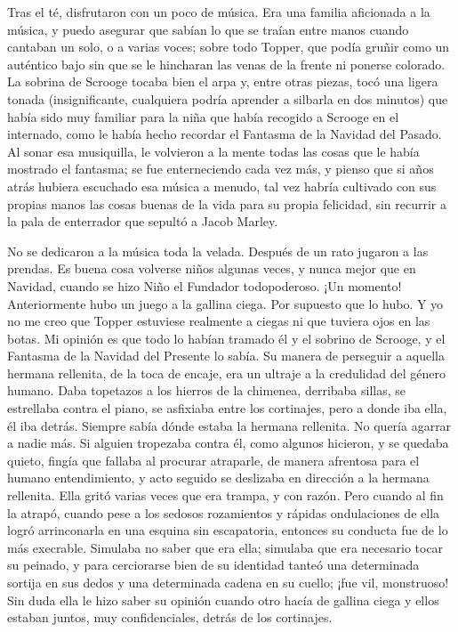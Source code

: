 \documentclass{novela}
\begin{document}
 Tras el té, disfrutaron con un poco de música. Era una familia aficionada a la música, y puedo asegurar que sabían lo que se traían entre manos cuando cantaban un solo, o a varias voces; sobre todo Topper, que podía gruñir como un auténtico bajo sin que se le hincharan las venas de la frente ni ponerse colorado. La sobrina de Scrooge tocaba bien el arpa y, entre otras piezas, tocó una ligera tonada (insignificante, cualquiera podría aprender a silbarla en dos minutos) que había sido muy familiar para la niña que había recogido a Scrooge en el internado, como le había hecho recordar el Fantasma de la Navidad del Pasado. Al sonar esa musiquilla, le volvieron a la mente todas las cosas que le había mostrado el fantasma; se fue enterneciendo cada vez más, y pienso que si años atrás hubiera escuchado esa música a menudo, tal vez habría cultivado con sus propias manos las cosas buenas de la vida para su propia felicidad, sin recurrir a la pala de enterrador que sepultó a Jacob Marley.

 No se dedicaron a la música toda la velada. Después de un rato jugaron a las prendas. Es buena cosa volverse niños algunas veces, y nunca mejor que en Navidad, cuando se hizo Niño el Fundador todopoderoso. ¡Un momento! Anteriormente hubo un juego a la gallina ciega. Por supuesto que lo hubo. Y yo no me creo que Topper estuviese realmente a ciegas ni que tuviera ojos en las botas. Mi opinión es que todo lo habían tramado él y el sobrino de Scrooge, y el Fantasma de la Navidad del Presente lo sabía. Su manera de perseguir a aquella hermana rellenita, de la toca de encaje, era un ultraje a la credulidad del género humano. Daba topetazos a los hierros de la chimenea, derribaba sillas, se estrellaba contra el piano, se asfixiaba entre los cortinajes, pero a donde iba ella, él iba detrás. Siempre sabía dónde estaba la hermana rellenita. No quería agarrar a nadie más. Si alguien tropezaba contra él, como algunos hicieron, y se quedaba quieto, fingía que fallaba al procurar atraparle, de manera afrentosa para el humano entendimiento, y acto seguido se deslizaba en dirección a la hermana rellenita. Ella gritó varias veces que era trampa, y con razón. Pero cuando al fin la atrapó, cuando pese a los sedosos rozamientos y rápidas ondulaciones de ella logró arrinconarla en una esquina sin escapatoria, entonces su conducta fue de lo más execrable. Simulaba no saber que era ella; simulaba que era necesario tocar su peinado, y para cerciorarse bien de su identidad tanteó una determinada sortija en sus dedos y una determinada cadena en su cuello; ¡fue vil, monstruoso! Sin duda ella le hizo saber su opinión cuando otro hacía de gallina ciega y ellos estaban juntos, muy confidenciales, detrás de los cortinajes.
\end{document}
